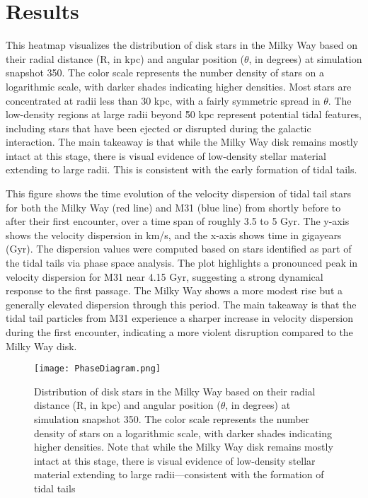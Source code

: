\documentclass[fleqn,usenatbib]{mnras}
\begin{document}
\section{Results}

This heatmap visualizes the distribution of disk stars in the Milky Way based on their radial distance (R, in kpc) and angular position ($\theta$, in degrees) at simulation snapshot 350. The color scale represents the number density of stars on a logarithmic scale, with darker shades indicating higher densities. Most stars are concentrated at radii less than 30 kpc, with a fairly symmetric spread in $\theta$. The low-density regions at large radii beyond \~50 kpc represent potential tidal features, including stars that have been ejected or disrupted during the galactic interaction. The main takeaway is that while the Milky Way disk remains mostly intact at this stage, there is visual evidence of low-density stellar material extending to large radii. This is consistent with the early formation of tidal tails.

This figure shows the time evolution of the velocity dispersion of tidal tail stars for both the Milky Way (red line) and M31 (blue line) from shortly before to after their first encounter, over a time span of roughly 3.5 to 5 Gyr. The y-axis shows the velocity dispersion in km/s, and the x-axis shows time in gigayears (Gyr). The dispersion values were computed based on stars identified as part of the tidal tails via phase space analysis. The plot highlights a pronounced peak in velocity dispersion for M31 near 4.15 Gyr, suggesting a strong dynamical response to the first passage. The Milky Way shows a more modest rise but a generally elevated dispersion through this period. The main takeaway is that the tidal tail particles from M31 experience a sharper increase in velocity dispersion during the first encounter, indicating a more violent disruption compared to the Milky Way disk.


\begin{figure}
    \centering
    \texttt{[image: PhaseDiagram.png]}
    \caption{Distribution of disk stars in the Milky Way based on their radial distance (R, in kpc) and angular position ($\theta$, in degrees) at simulation snapshot 350. The color scale represents the number density of stars on a logarithmic scale, with darker shades indicating higher densities. Note that while the Milky Way disk remains mostly intact at this stage, there is visual evidence of low-density stellar material extending to large radii—consistent with the formation of tidal tails }
    \label{fig:enter-label}
\end{figure}
\end{document}
